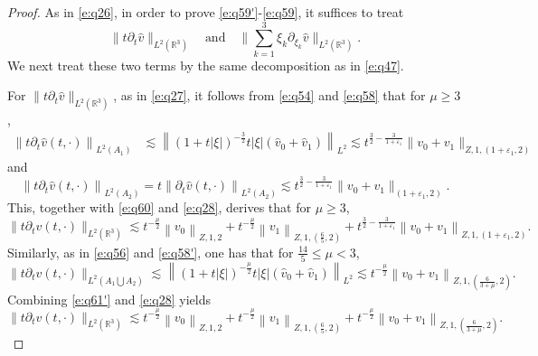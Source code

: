 \documentclass[11pt,twoside]{article}
\newcommand{\R}{\mathbb R}
\newcommand{\p}{\partial}
\newcommand{\f}{\frac}
\theoremstyle{plain}
\theoremstyle{definition}
\theoremstyle{remark}
\numberwithin{equation}{section}
\begin{document}
\begin{proof}
As in \eqref{e:q26}, in order to prove \eqref{e:q59'}-\eqref{e:q59}, it suffices to treat
\[
\|t\partial_t\hat v\|_{L^2(\R^3)}
\quad\text{and}\quad
\|\sum_{k=1}^3\xi_k\p_{\xi_k}\hat{v}\|_{L^2(\R^3)}.
\]
We next treat these two terms by the same decomposition as in \eqref{e:q47}.

For $\|t\p_t\hat{v}\|_{L^2(\R^3)}$, as in \eqref{e:q27}, it follows from \eqref{e:q54} and \eqref{e:q58} that for $\mu\geq3$,
\begin{equation}\label{e:q60}
\begin{aligned}
\left\|t\p_t\hat{v}(t, \cdot)\right\|_{L^2(A_1)}  &\lesssim\left\|(1+t|\xi|)^{-\f32}t|\xi|(\hat{v}_{0}+\hat{v}_{1})\right\|_{L^{2}}
\lesssim t^{\f32-\f{3}{1+\varepsilon_1}}\|v_0+v_1\|_{Z,1, (1+\varepsilon_1, 2)}
\end{aligned}
\end{equation}
and
$$
\left\|t\p_t\hat{v}(t, \cdot)\right\|_{L^2(A_2)}=t\left\|\p_t\hat{v}(t, \cdot)\right\|_{L^2(A_2)} \lesssim t^{\f32-\f{3}{1+\varepsilon_1}}\|v_0+v_1\|_{(1+\varepsilon_1, 2)}.
$$
This, together with \eqref{e:q60} and \eqref{e:q28}, derives that for $\mu\geq3$,
\begin{equation}\label{e:q61}
\|t\p_tv(t, \cdot)\|_{L^2(\R^3)} \lesssim t^{-\f{\mu}{2}}\left\|v_0\right\|_{Z, 1, 2}+t^{-\f{\mu}{2}}\left\|v_1\right\|_{Z, 1,(\f65, 2)}+t^{\f32-\f{3}{1+\varepsilon_1}}\left\|v_0+v_1\right\|_{Z, 1,(1+\varepsilon_1, 2)}.
\end{equation}
Similarly, as in \eqref{e:q56} and \eqref{e:q58'}, one has that for $\f{14}{5}\leq\mu<3$,
\begin{equation}\label{e:q61'}
\|t\p_tv(t, \cdot)\|_{L^2(A_1\bigcup A_2)} \lesssim\left\|(1+t|\xi|)^{-\f{\mu}{2}}t|\xi|(\hat{v}_{0}+\hat{v}_{1})\right\|_{L^{2}} \lesssim t^{-\f{\mu}{2}}\left\|v_0+v_1\right\|_{Z, 1,(\f{6}{3+\mu}, 2)}.
\end{equation}
Combining \eqref{e:q61'} and \eqref{e:q28} yields
\begin{equation}\label{e:q61''}
\|t\p_tv(t, \cdot)\|_{L^2(\R^3)} \lesssim t^{-\f{\mu}{2}}\left\|v_0\right\|_{Z, 1, 2}+t^{-\f{\mu}{2}}\left\|v_1\right\|_{Z, 1,(\f65, 2)}+t^{-\f{\mu}{2}}\left\|v_0+v_1\right\|_{Z, 1,(\f{6}{3+\mu}, 2)}.
\end{equation}


\end{proof}
\end{document}
